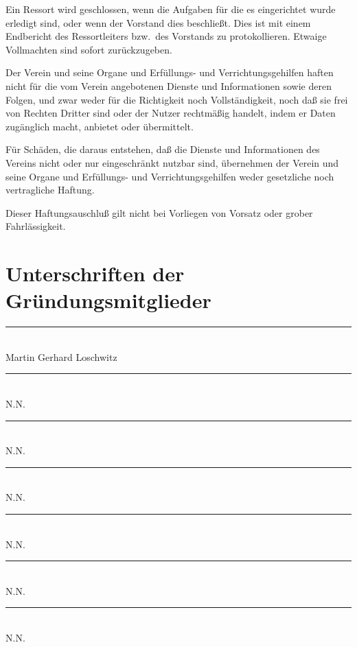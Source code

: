 \documentclass[draft]{scrartcl}
\begin{document}
\begin{contract}
Ein Ressort wird geschlossen, wenn die Aufgaben für die es eingerichtet wurde
erledigt sind, oder wenn der Vorstand dies beschließt. Dies ist mit einem
Endbericht des Ressortleiters bzw.\ des Vorstands zu protokollieren. Etwaige
Vollmachten sind sofort zurückzugeben.


Der Verein und seine Organe und Erfüllungs- und Verrichtungsgehilfen haften
nicht für die vom Verein angebotenen Dienste und Informationen sowie deren
Folgen, und zwar weder für die Richtigkeit noch Vollständigkeit, noch daß sie
frei von Rechten Dritter sind oder der Nutzer rechtmäßig handelt, indem er
Daten zugänglich macht, anbietet oder übermittelt.

Für Schäden, die daraus entstehen, daß die Dienste und Informationen des
Vereins nicht oder nur eingeschränkt nutzbar sind, übernehmen der Verein und
seine Organe und Erfüllungs- und Verrichtungsgehilfen weder gesetzliche noch
vertragliche Haftung.

Dieser Haftungsauschluß gilt nicht bei Vorliegen von Vorsatz oder grober
Fahr\-läss\-ig\-keit.

\end{contract}

\pagebreak\section*{Unterschriften der Gründungsmitglieder}

\vspace{3em}

\rule{6cm}{0.4pt} \\
\noindent Martin Gerhard Loschwitz \\
\vspace{2em}

\rule{6cm}{0.4pt} \\
\noindent N.N. \\
\vspace{2em}

\rule{6cm}{0.4pt} \\
\noindent N.N. \\
\vspace{2em}

\rule{6cm}{0.4pt} \\
\noindent N.N. \\
\vspace{2em}

\rule{6cm}{0.4pt} \\
\noindent N.N. \\
\vspace{2em}

\rule{6cm}{0.4pt} \\
\noindent N.N. \\
\vspace{2em}

\rule{6cm}{0.4pt} \\
\noindent N.N.
\end{document}
